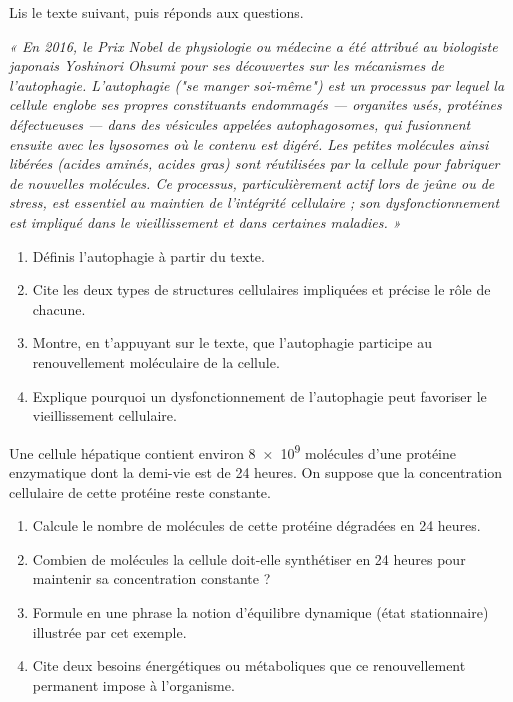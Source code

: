 \documentclass[11pt]{article}
\newcommand{\cle}[1]{{\popxbold\color{popdark}#1}}
\begin{document}
\begin{exercice}
Lis le texte suivant, puis réponds aux questions.

\emph{« En 2016, le Prix Nobel de physiologie ou médecine a été attribué au biologiste japonais Yoshinori Ohsumi pour ses découvertes sur les mécanismes de l'autophagie. L'autophagie ("se manger soi-même") est un processus par lequel la cellule englobe ses propres constituants endommagés — organites usés, protéines défectueuses — dans des vésicules appelées autophagosomes, qui fusionnent ensuite avec les lysosomes où le contenu est digéré. Les petites molécules ainsi libérées (acides aminés, acides gras) sont réutilisées par la cellule pour fabriquer de nouvelles molécules. Ce processus, particulièrement actif lors de jeûne ou de stress, est essentiel au maintien de l'intégrité cellulaire ; son dysfonctionnement est impliqué dans le vieillissement et dans certaines maladies. »}

\begin{enumerate}
\item Définis l'autophagie à partir du texte.
\item Cite les deux types de structures cellulaires impliquées et précise le rôle de chacune.
\item Montre, en t'appuyant sur le texte, que l'autophagie participe au renouvellement moléculaire de la cellule.
\item Explique pourquoi un dysfonctionnement de l'autophagie peut favoriser le vieillissement cellulaire.
\end{enumerate}
\end{exercice}

\begin{exercice}
Une cellule hépatique contient environ \num{8e9} molécules d'une protéine enzymatique dont la demi-vie est de 24 heures. On suppose que la concentration cellulaire de cette protéine reste constante.
\begin{enumerate}
\item Calcule le nombre de molécules de cette protéine dégradées en 24 heures.
\item Combien de molécules la cellule doit-elle synthétiser en 24 heures pour maintenir sa concentration constante ?
\item Formule en une phrase la notion d'\cle{équilibre dynamique} (état stationnaire) illustrée par cet exemple.
\item Cite deux besoins énergétiques ou métaboliques que ce renouvellement permanent impose à l'organisme.
\end{enumerate}
\end{exercice}
\end{document}
